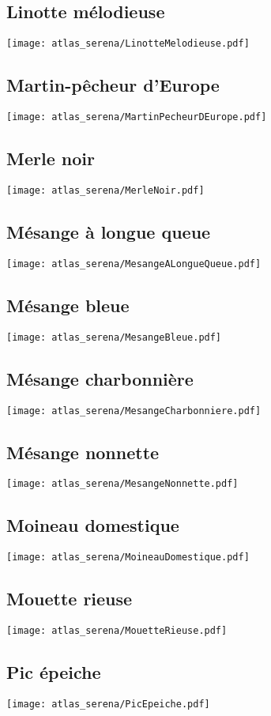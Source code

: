 \subsection{Linotte mélodieuse}
\texttt{[image: atlas\_serena/LinotteMelodieuse.pdf]}
\subsection{Martin-pêcheur d'Europe}
\texttt{[image: atlas\_serena/MartinPecheurDEurope.pdf]}
\subsection{Merle noir}
\texttt{[image: atlas\_serena/MerleNoir.pdf]}
\subsection{Mésange à longue queue}
\texttt{[image: atlas\_serena/MesangeALongueQueue.pdf]}
\subsection{Mésange bleue}
\texttt{[image: atlas\_serena/MesangeBleue.pdf]}
\subsection{Mésange charbonnière}
\texttt{[image: atlas\_serena/MesangeCharbonniere.pdf]}
\subsection{Mésange nonnette}
\texttt{[image: atlas\_serena/MesangeNonnette.pdf]}
\subsection{Moineau domestique}
\texttt{[image: atlas\_serena/MoineauDomestique.pdf]}
\subsection{Mouette rieuse}
\texttt{[image: atlas\_serena/MouetteRieuse.pdf]}
\subsection{Pic épeiche}
\texttt{[image: atlas\_serena/PicEpeiche.pdf]}

